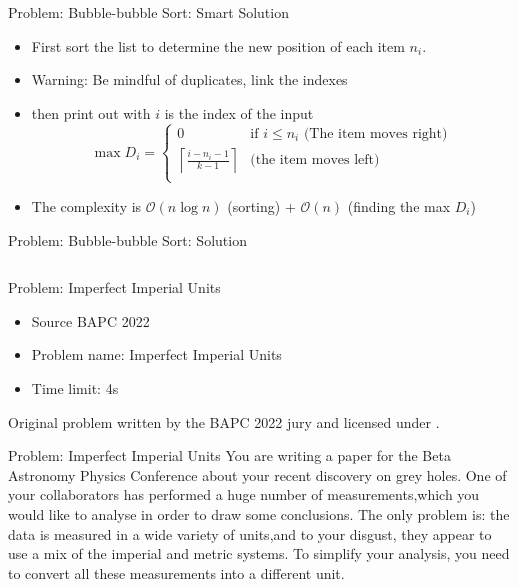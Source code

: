 \documentclass[11pt,pdf, aspectratio=169]{beamer}
\begin{document}
  \begin{frame}{Problem: Bubble-bubble Sort: Smart Solution}
    \begin{itemize}
      \item<1-> First sort the list to determine the new position of each item $n_i$.
      \item<1-> Warning: Be mindful of duplicates, link the indexes
      \item<2-> then print out with $i$ is the index of the input
      \[\max D_i = \begin{cases}
                     0 & \text{if } i \leq n_i \text{ (The item moves right)}\\
                     \left\lceil\frac{i-n_i - 1}{k-1}\right\rceil & \text{(the item moves left)} \\
      \end{cases}\]
      \item<3-> The complexity is $\mathcal{O}(n\log{}n)$ (sorting) + $\mathcal{O}(n)$ (finding the max $D_i$)
    \end{itemize}
  \end{frame}
  \begin{frame}[containsverbatim]{ Problem: Bubble-bubble Sort: Solution}
    \inputminted{python}{code/session-1/python/dapc-b.py}
  \end{frame}
  \begin{frame}{Problem: Imperfect Imperial Units}
    \begin{itemize}
      \item Source BAPC 2022
      \item Problem name: Imperfect Imperial Units
      \item Time limit: 4s
    \end{itemize}
    Original problem written by the BAPC 2022 jury and licensed under \doclicenseLongNameRef.

    \doclicenseImage
  \end{frame}
  \begin{frame}{Problem: Imperfect Imperial Units}
    You are writing a paper for the Beta Astronomy Physics Conference about your recent discovery on grey holes.
    One of your collaborators has performed a huge number of measurements,which you would like to analyse in order to draw some conclusions.
    The only problem is: the data is measured in a wide variety of units,and to your disgust, they appear to use a mix of the imperial and metric systems.
    To simplify your analysis, you need to convert all these measurements into a different unit.
  \end{frame}
\end{document}
